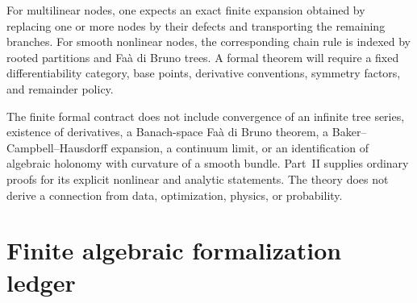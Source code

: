 \begin{roadmap}
\label{roadmap:tree-defect}
For multilinear nodes, one expects an exact finite expansion obtained by
replacing one or more nodes by their defects and transporting the remaining
branches.  For smooth nonlinear nodes, the corresponding chain rule is
indexed by rooted partitions and Fa\`a di Bruno trees.  A formal theorem will
require a fixed differentiability category, base points, derivative
conventions, symmetry factors, and remainder policy.
\end{roadmap}

\begin{boundary}
The finite formal contract does not include convergence of an infinite tree series, existence
of derivatives, a Banach-space Fa\`a di Bruno theorem, a Baker--Campbell--Hausdorff
expansion, a continuum limit, or an identification of algebraic holonomy with
curvature of a smooth bundle. Part~II supplies ordinary proofs for its explicit nonlinear and analytic statements. The theory does not derive a connection from
data, optimization, physics, or probability.
\end{boundary}

\section{Finite algebraic formalization ledger}
\label{sec:ledger}

